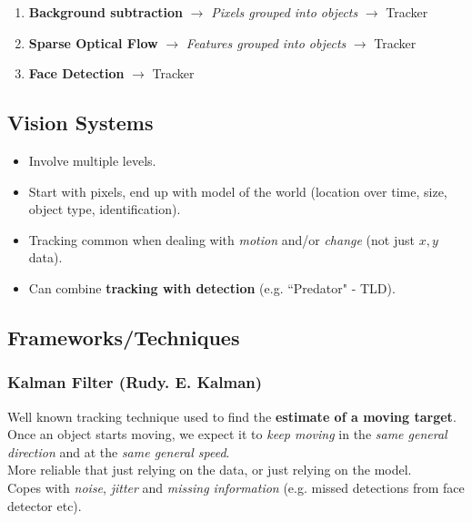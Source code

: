\documentclass[english, 10pt]{article}
\begin{document}
\begin{enumerate}
\item \textbf{Background subtraction} $\rightarrow$ \textit{Pixels grouped into objects} $\rightarrow$ Tracker
\item \textbf{Sparse Optical Flow} $\rightarrow$ \textit{Features grouped into objects} $\rightarrow$ Tracker
\item \textbf{Face Detection} $\rightarrow$ Tracker
\end{enumerate}

\subsection{Vision Systems}

\begin{itemize}
\item Involve multiple levels.
\item Start with pixels, end up with model of the world (location over time, size, object type, identification).
\item Tracking common when dealing with \textit{motion} and/or \textit{change} (not just $x,y$ data).
\item Can combine \textbf{tracking with detection} (e.g. ``Predator" - TLD).
\end{itemize}

\subsection{Frameworks/Techniques}

\subsubsection{Kalman Filter (Rudy. E. Kalman)}

Well known tracking technique used to find the \textbf{estimate of a moving target}. \\

Once an object starts moving, we expect it to \textit{keep moving} in the \textit{same general direction} and at the \textit{same general speed}. \\

More reliable that just relying on the data, or just relying on the model.\\

Copes with \textit{noise}, \textit{jitter} and \textit{missing information} (e.g. missed detections from face detector etc).
\end{document}
